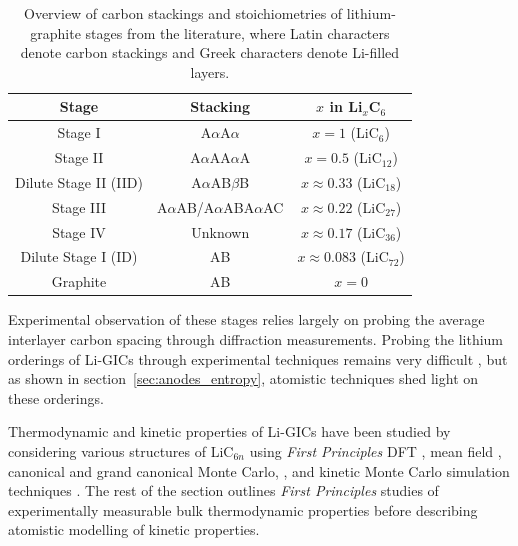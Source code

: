 \documentclass[../main.tex]{subfiles}
\begin{document}
\begin{table}
    \caption{{Overview of carbon stackings and stoichiometries of lithium-graphite stages from the literature, where Latin characters denote carbon stackings and Greek characters denote Li-filled layers. \cite{TRUCANO1975,Okamoto1989,GUERARD1975337,Billaud1996,BILLAUD2002299,Woo1983,Dahn1991,Ohzuku1993,Konar2015,didier2020}}}
    \label{table:graphite_stages}
    \begin{tabular}{|c c c|} 
         \hline
         Stage & Stacking & $x$ in Li$_{x}$C$_{6}$  \\
         \hline
         Stage I & A$\alpha$A$\alpha$ & $x = 1$ (LiC$_{6}$)    \\
         Stage II & A$\alpha$AA$\alpha$A & $x = 0.5$ (LiC$_{12}$)  \\
         Dilute Stage II (IID) & A$\alpha$AB$\beta$B & $x \approx 0.33$ (LiC$_{18}$)   \\
         Stage III & A$\alpha$AB/A$\alpha$ABA$\alpha$AC & $x \approx 0.22$ (LiC$_{27}$) \\
         Stage IV & Unknown & $x \approx 0.17$ (LiC$_{36}$)  \\
         Dilute Stage I (ID) & AB & $x \approx 0.083$ (LiC$_{72}$)  \\
         Graphite & AB & $x = 0$   \\
         \hline
    \end{tabular}
\end{table}

Experimental observation of these stages relies largely on probing the average interlayer carbon spacing through diffraction measurements. Probing the lithium orderings of Li-GICs through experimental techniques remains very difficult \cite{Zheng1995,Konar2015,Senyshyn2013,Taminato2016,Mercer2019,Mercer2021}, but as shown in section~\ref{sec:anodes_entropy}, atomistic techniques shed light on these orderings.

Thermodynamic and kinetic properties of Li-GICs have been studied by considering various structures of LiC$_{6n}$ using \textit{First Principles} DFT \cite{thinius2014theoretical, Hakim, Qiong, Doreen,JI201866,Wang,persson2010,persson2010lithium,hazrati_li_2014,peng2020lithium,hazrati_li_2014}, mean field \cite{Mercer2019,Leiva2017b,OTERO2017569}, canonical and grand canonical Monte Carlo, \cite{Gavil_n_Arriazu_2018,persson2010,C7CP04253A}, and kinetic Monte Carlo simulation techniques \cite{JI201866,persson2010,gavilan-arriazu_effect_2020,gavilan-arriazu_kinetic_2020,GAVILANARRIAZU2018133}. The rest of the section outlines \textit{First Principles} studies of experimentally measurable bulk thermodynamic properties before describing atomistic modelling of kinetic properties.
\end{document}
